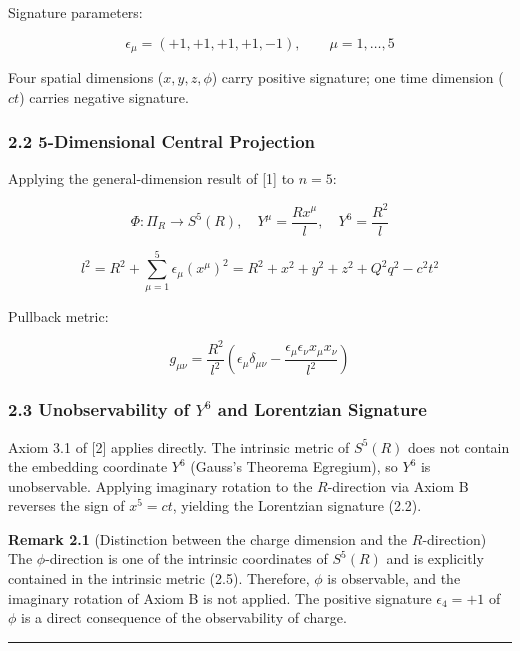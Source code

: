 \documentclass[a4paper,11pt]{article}
\theoremstyle{definition}
\begin{document}
Signature parameters:

\[\epsilon_\mu = (+1, +1, +1, +1, -1), \qquad \mu = 1, \ldots, 5 \tag{2.2}\]

Four spatial dimensions (\(x, y, z, \phi\)) carry positive signature; one time dimension (\(ct\)) carries negative signature.

\subsubsection{2.2 5-Dimensional Central Projection}\label{dimensional-central-projection}

Applying the general-dimension result of {[}1{]} to \(n = 5\):

\[\Phi: \Pi_R \to S^5(R), \quad Y^\mu = \frac{Rx^\mu}{l}, \quad Y^6 = \frac{R^2}{l} \tag{2.3}\]

\[l^2 = R^2 + \sum_{\mu=1}^{5} \epsilon_\mu (x^\mu)^2 = R^2 + x^2 + y^2 + z^2 + Q^2 q^2 - c^2t^2 \tag{2.4}\]

Pullback metric:

\[g_{\mu\nu} = \frac{R^2}{l^2}\left(\epsilon_\mu \delta_{\mu\nu} - \frac{\epsilon_\mu \epsilon_\nu x_\mu x_\nu}{l^2}\right) \tag{2.5}\]

\subsubsection{\texorpdfstring{2.3 Unobservability of \(Y^6\) and Lorentzian Signature}{2.3 Unobservability of Y\^{}6 and Lorentzian Signature}}\label{unobservability-of-y6-and-lorentzian-signature}

Axiom 3.1 of {[}2{]} applies directly. The intrinsic metric of \(S^5(R)\) does not contain the embedding coordinate \(Y^6\) (Gauss's Theorema Egregium), so \(Y^6\) is unobservable. Applying imaginary rotation to the \(R\)-direction via Axiom B reverses the sign of \(x^5 = ct\), yielding the Lorentzian signature (2.2).

\textbf{Remark 2.1} (Distinction between the charge dimension and the \(R\)-direction)\\
The \(\phi\)-direction is one of the intrinsic coordinates of \(S^5(R)\) and is explicitly contained in the intrinsic metric (2.5). Therefore, \(\phi\) is observable, and the imaginary rotation of Axiom B is not applied. The positive signature \(\epsilon_4 = +1\) of \(\phi\) is a direct consequence of the observability of charge.

\begin{center}\rule{0.5\linewidth}{0.5pt}\end{center}
\end{document}
